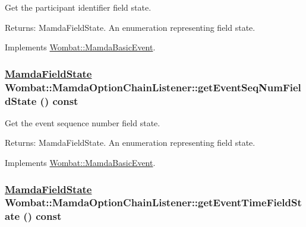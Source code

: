 Get the participant identifier field state. 

\begin{Desc}
\item[Returns:]Mamda\-Field\-State. An enumeration representing field state. \end{Desc}


Implements \hyperlink{classWombat_1_1MamdaBasicEvent_c361c99af2cf7eb9f5621d89f744fc62}{Wombat::Mamda\-Basic\-Event}.\hypertarget{classWombat_1_1MamdaOptionChainListener_b268208b087785469f9d86c71e01811b}{
\subsubsection[getEventSeqNumFieldState]{\setlength{\rightskip}{0pt plus 5cm}\hyperlink{namespaceWombat_93aac974f2ab713554fd12a1fa3b7d2a}{Mamda\-Field\-State} Wombat::Mamda\-Option\-Chain\-Listener::get\-Event\-Seq\-Num\-Field\-State () const}}
\label{classWombat_1_1MamdaOptionChainListener_b268208b087785469f9d86c71e01811b}


Get the event sequence number field state. 

\begin{Desc}
\item[Returns:]Mamda\-Field\-State. An enumeration representing field state. \end{Desc}


Implements \hyperlink{classWombat_1_1MamdaBasicEvent_51cc0b9d4c2b8a982ccd18b339707cb5}{Wombat::Mamda\-Basic\-Event}.\hypertarget{classWombat_1_1MamdaOptionChainListener_8942c3987173fa87ec07f38cba68fc15}{
\subsubsection[getEventTimeFieldState]{\setlength{\rightskip}{0pt plus 5cm}\hyperlink{namespaceWombat_93aac974f2ab713554fd12a1fa3b7d2a}{Mamda\-Field\-State} Wombat::Mamda\-Option\-Chain\-Listener::get\-Event\-Time\-Field\-State () const}}
\label{classWombat_1_1MamdaOptionChainListener_8942c3987173fa87ec07f38cba68fc15}


